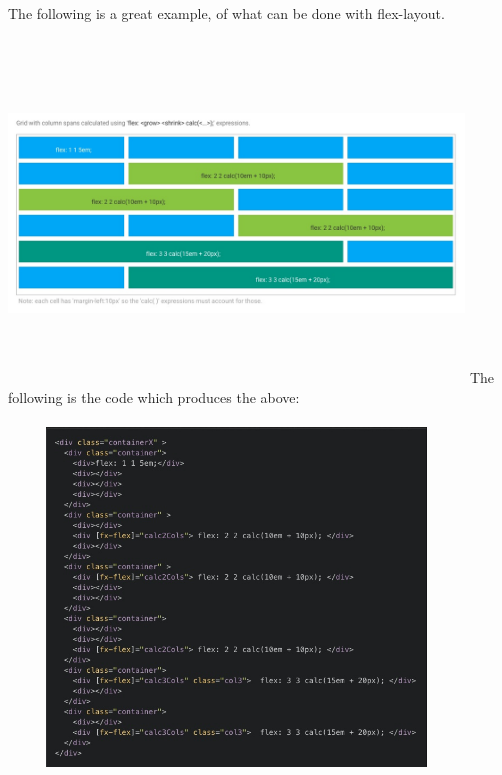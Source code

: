 The following is a great example, of what can be done with flex-layout.
\\
\\
\includegraphics[width=12.1cm, height=9cm]{responsive/flex-layout/flex-layout-grid}
The following is the code which produces the above:
\\
\\
\includegraphics[width=12.1cm, height=9cm]{responsive/flex-layout/flex-layout-code}

